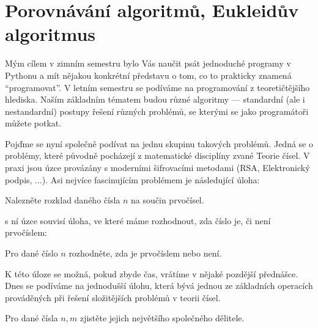 \ifx\ucebnice\undefined

\setcounter{section}{0}
\else
\renewcommand{\section}[1]{\chapter{#1}}
\fi
\section{Porovnávání algoritmů, Eukleidův algoritmus}

Mým cílem v zimním semestru bylo Vás naučit psát jednoduché programy v Pythonu a mít nějakou konkrétní představu o tom,
co to prakticky znamená ``programovat''. V letním semestru se podíváme na programování z teoretičtějšího hlediska.
Naším základním tématem budou různé algoritmy --- standardní (ale i nestandardní) postupy řešení různých problémů, 
se kterými se jako programátoři můžete potkat. 

Pojďme se nyní společně podívat na jednu skupinu takových problémů. Jedná se o problémy, které původně pocházejí z
matematické disciplíny zvané Teorie čísel. V praxi jsou úzce provázány s moderními šifrovacími metodami 
(RSA, Elektronický podpis, ...). Asi nejvíce fascinujícím problémem je následující úloha:

\begin{uloha}
Nalezněte rozklad daného čísla $n$ na součin prvočísel.
\end{uloha}

s ní úzce souvisí úloha, ve které máme rozhodnout, zda číslo je, či není prvočíslem:

\begin{uloha}
Pro dané číslo $n$ rozhodněte, zda je prvočíslem nebo není.
\end{uloha}

K této úloze se možná, pokud zbyde čas, vrátíme v nějaké pozdější přednášce. Dnes se podíváme na jednodušší úlohu, která
bývá jednou ze základních operacích prováděných při řešení složitějších problémů v teorii čísel. 

\begin{uloha}
Pro dané čísla $n,m$ zjistěte jejich největšího společného dělitele.
\end{uloha}



